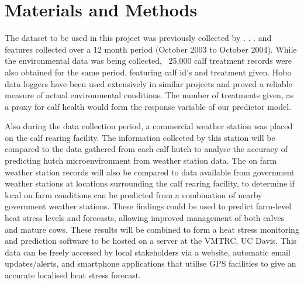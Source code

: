 \documentclass[12pt]{article}
\begin{document}
	\newpage
	\section{Materials and Methods}
		The dataset to be used in this project was previously collected by . . .  %
		and features collected over a 12 month period (October 2003 to October 2004). While the environmental data was being collected, ~25,000 calf treatment records were also obtained for the same period, featuring calf id's and treatment given. 
		Hobo data loggers have been used extensively in similar projects and proved a reliable measure of actual environmental conditions\cite{Scharf2011,Jousan2007}.
		The number of treatments given, as a proxy for calf health would form the response variable of our predictor model. %

		Also during the data collection period, a commercial weather station was placed on the calf rearing facility. The information collected by this station will be compared to the data gathered from each calf hutch to analyse the accuracy of predicting hutch microenvironment from weather station data. 
		The on farm weather station records will also be compared to data available from government weather stations at locations surrounding the calf rearing facility, to determine if local on farm conditions can be predicted from a combination of nearby government weather stations. These findings could be used to predict farm-level heat stress levels and forecasts, allowing improved management of both calves and mature cows.
		These results will be combined to form a heat stress monitoring and prediction software to be hosted on a server at the VMTRC, UC Davis. This data can be freely accessed by local stakeholders via a website, automatic email updates/alerts, and smartphone applications that utilise GPS facilities to give an accurate localised heat stress forecast.
	\newpage
	
	
\end{document}
